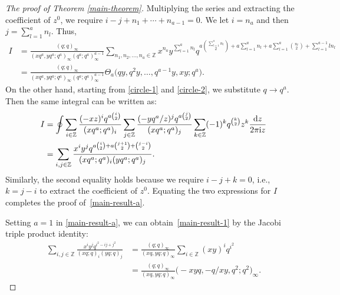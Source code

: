 \documentclass[pdftex]{sigma}
\numberwithin{equation}{section}
\theoremstyle{definition}
\begin{document}
\begin{proof}[The proof of Theorem \ref{main-theorem}]
Multiplying the series and extracting the coefficient of $z^0$, we require $i-j+n_1+\cdots+n_{a-1}=0$. We let $i=n_a$ and then $j=\sum_{l=1}^an_l$. Thus,
\begin{align*}
I&=\frac{(q;q)_{\infty}}{(xq^a,yq^a;q^a)_{\infty}(q^a;q^a)^{a-1}_{\infty}} \!\sum_{n_1,n_2,\dots,n_a\in\mathbb{Z}}\!\!\!\! x^{n_a}y^{\sum_{l=1}^an_l}q^{a\binom{\sum_{l=1}^an_l}{2}+a\sum_{l=1}^an_l+a\sum_{l=1}^{a}\binom{n_l}{2}+\sum_{l=1}^{a-1}ln_l}\\
&=\frac{(q;q)_{\infty}}{(xq^a,yq^a;q^a)_{\infty}(q^a;q^a)_{\infty}^{a-1}}\Theta_a\bigl(qy,q^2y,\dots,q^{a-1}y,xy;q^a\bigr).
\end{align*}
On the other hand, starting from \eqref{circle-1} and \eqref{circle-2}, we substitute $q\rightarrow q^a$. Then the same integral can be written as:
\begin{align*}
I&=\oint\sum_{i\in\mathbb{Z}}\frac{(-xz)^iq^{a\binom{i}{2}}}{(xq^a;q^a)_i}\sum_{j\in\mathbb{Z}} \frac{(-yq^a/z)^jq^{a\binom{j}{2}}}{(xq^a;q^a)_j}\sum_{k\in\mathbb{Z}}(-1)^kq^{\binom{k}{2}}z^k\frac{{\rm d}z}{2\pi {\rm i}z}\\
&=\sum_{i,j\in \mathbb{Z}}\frac{x^iy^jq^{a\binom{i}{2}+a\binom{j+1}{2}+\binom{j-i}{2}}}{(xq^a;q^a)_i(yq^a;q^a)_j}.
\end{align*}
Similarly, the second equality holds because we require $i-j+k=0$, i.e., $k=j-i$ to extract the coefficient of $z^0$. Equating the two expressions for $I$ completes the proof of~\eqref{main-result-a}.

Setting $a=1$ in \eqref{main-result-a}, we can obtain~\eqref{main-result-1} by the Jacobi triple product identity:
\begin{align*}
 \sum_{i,j \in \mathbb{Z}} \frac{x^i y^j q^{i^2 - ij + j^2}}{(xq; q)_i (yq; q)_j}
 & =\frac{(q;q)_\infty}{(xq,yq;q)_\infty}\sum_{i\in \mathbb{Z}}(xy)^iq^{i^2} \\
 & =\frac{(q;q)_\infty}{(xq,yq;q)_\infty}\bigl(-xyq,-q/xy,q^2;q^2\bigr)_\infty.
\end{align*}


\end{proof}
\end{document}

